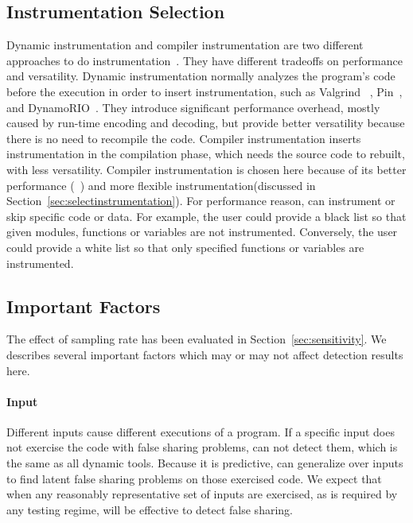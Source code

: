 \label{sec:discussion}

\subsection{Instrumentation Selection}
\label{sec:instrumentationtradeoff}
Dynamic instrumentation and compiler instrumentation are two different approaches to do instrumentation~\cite{Instrumentation}. They have different tradeoffs on performance and versatility. Dynamic instrumentation normally analyzes the program's code before the execution in order to insert instrumentation, such as Valgrind ~\cite{Valgrind}, Pin~\cite{Pin}, and DynamoRIO~\cite{DynamoRIO}. They introduce significant performance overhead, mostly caused by run-time encoding and decoding, but provide better versatility because there is no need to recompile the code. Compiler instrumentation inserts instrumentation in the compilation phase, which needs the source code to rebuilt, with less versatility. 
Compiler instrumentation is chosen here because of its better performance (~\cite{Instrumentation}) and more flexible instrumentation(discussed in Section~\ref{sec:selectinstrumentation}). For performance reason, \Predator{} can instrument or skip specific code or data. For example, the user could provide a black list so that given modules, functions or variables are not instrumented. Conversely, the user could provide a white list so that only specified functions or variables are instrumented.

\subsection{Important Factors}
The effect of sampling rate has been evaluated in Section~\ref{sec:sensitivity}.  We describes several important factors which may or may not affect detection results here. 

\paragraph{Input} Different inputs cause different executions of a program. If a specific input does not exercise the code with false sharing problems, \Predator{} can not detect them, which is the same as all dynamic tools. Because it is predictive, \Predator{} can generalize over inputs to find latent false sharing problems on those exercised code. We expect that when any reasonably representative set of inputs are exercised, as is required by any testing regime, \Predator{} will be effective to detect false sharing.


